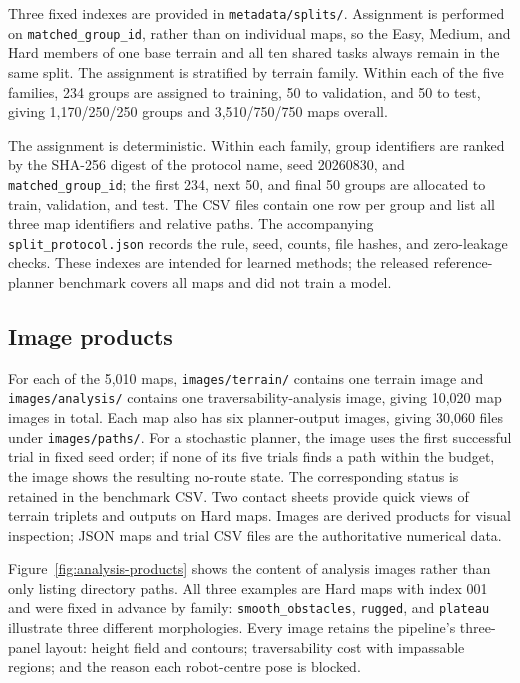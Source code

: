 \documentclass[11pt]{article}
\begin{document}
Three fixed indexes are provided in \texttt{metadata/splits/}. Assignment is
performed on \texttt{matched\_group\_id}, rather than on individual maps, so the
Easy, Medium, and Hard members of one base terrain and all ten shared tasks
always remain in the same split. The assignment is stratified by terrain
family. Within each of the five families, 234 groups are assigned to training,
50 to validation, and 50 to test, giving 1,170/250/250 groups and
3,510/750/750 maps overall.

The assignment is deterministic. Within each family, group identifiers are
ranked by the SHA-256 digest of the protocol name, seed 20260830, and
\texttt{matched\_group\_id}; the first 234, next 50, and final 50 groups are
allocated to train, validation, and test. The CSV files contain one row per
group and list all three map identifiers and relative paths. The accompanying
\texttt{split\_protocol.json} records the rule, seed, counts, file hashes, and
zero-leakage checks. These indexes are intended for learned methods; the
released reference-planner benchmark covers all maps and did not train a model.

\subsection{Image products}

For each of the 5,010 maps, \texttt{images/terrain/} contains one terrain image
and \texttt{images/analysis/} contains one traversability-analysis image,
giving 10,020 map images in total. Each map also has six planner-output images,
giving 30,060 files under \texttt{images/paths/}. For a stochastic planner, the
image uses the first successful trial in fixed seed order; if none of its five
trials finds a path within the budget, the image shows the resulting no-route
state. The corresponding status is retained in the benchmark CSV. Two contact
sheets provide quick views of terrain triplets and outputs on Hard maps. Images
are derived products for visual inspection; JSON maps and trial CSV files are
the authoritative numerical data.

Figure~\ref{fig:analysis-products} shows the content of analysis images rather
than only listing directory paths. All three examples are Hard maps with index
001 and were fixed in advance by family: \texttt{smooth\_obstacles},
\texttt{rugged}, and \texttt{plateau} illustrate three different
morphologies. Every image retains the pipeline's three-panel layout: height
field and contours; traversability cost with impassable regions; and the reason
each robot-centre pose is blocked.
\end{document}
